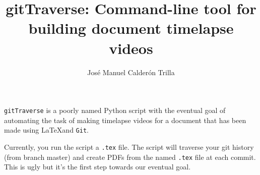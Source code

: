 \documentclass{article}
\title{gitTraverse: Command-line tool for building document timelapse videos}
\author{Jos\'{e} Manuel Calder\'{o}n Trilla}
\begin{document}
\maketitlee

\verb=gitTraverse= is a poorly named Python script with the eventual goal of automating
the task of making timelapse videos for a document that has been made using \LaTeX and
\verb=Git=.

Currently, you run the script a \verb=.tex= file. The script will traverse your git 
history (from branch master) and create PDFs from the named \verb=.tex= file at
each commit. This is ugly but it's the first step towards our eventual goal.
\end{document}
